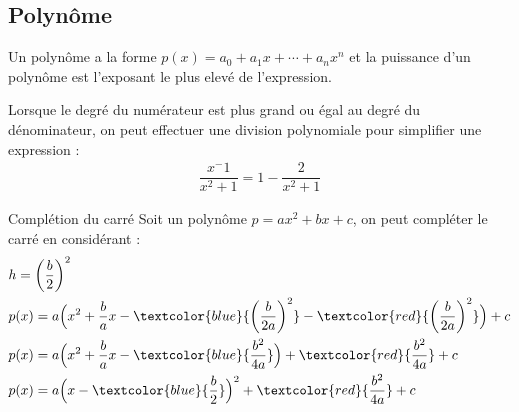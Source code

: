 \documentclass{report}
\begin{document}
\begin{multicols*}{3}
\section{Polynôme}
\begin{Definitionx*}{}{}
  Un polynôme a la forme $p(x) = a_0 + a_1x + \cdots + a_nx^n$ et la \textcolor{myb}{puissance} d'un polynôme 
  est l'exposant le plus elevé de l'expression.    
\end{Definitionx*}

\begin{note}{}{}
    Lorsque le degré du numérateur est plus grand ou égal au degré du dénominateur, on peut effectuer une division 
    polynomiale pour simplifier une expression : 
    \begin{align*}
      \dfrac{x^-1}{x^2 +1} = 1 - \dfrac{2}{x^2 +1}
    \end{align*}
\end{note}



\begin{Concept}{Complétion du carré}{}
  Soit un polynôme $p = ax^2 + bx + c$, on peut compléter le carré en considérant : 
  \begin{align*}
  &h = \left(\dfrac{b}{2}\right)^2 \\ 
  &p(x) = a\Bigl(x^2 + \dfrac{b}{a}x - \textcolor{blue}{\left(\dfrac{b}{2a}\right)^2} 
  - \textcolor{red}{\left(\dfrac{b}{2a}\right)^2}\Bigr)  + c               
  \\
  &p(x) = a\Bigl(x^2 + \dfrac{b}{a} x - \textcolor{blue}{\dfrac{b^2}{4a}}\Bigr) + \textcolor{red}{\dfrac{b^2}{4a}}  + c   
  \\
  &p(x) = a\Bigl(x - \textcolor{blue}{\dfrac{b}{2}}\Bigr)^2 +  
  \textcolor{red}{\dfrac{b^2}{4a}}  + c  
  \end{align*}


  
\end{Concept}

\end{multicols*}
\end{document}
